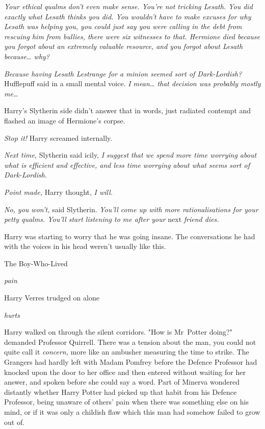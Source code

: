 \emph{Your ethical qualms don't even make sense. You're not tricking Lesath.
You did exactly what Lesath thinks you did. You wouldn't have to make excuses
for why Lesath was helping you, you could just say you were calling in the debt
from rescuing him from bullies, there were six witnesses to that. Hermione died
because you forgot about an extremely valuable resource, and you forgot about
Lesath because{\ldots} why?}

\emph{Because having Lesath Lestrange for a minion seemed sort of
Dark-Lordish?} Hufflepuff said in a small mental voice. \emph{I mean{\ldots}
that decision was probably mostly me{\ldots}}

Harry's Slytherin side didn't answer that in words, just radiated contempt and
flashed an image of Hermione's corpse.

\emph{Stop it!} Harry screamed internally.

\emph{Next time,} Slytherin said icily, \emph{I suggest that we spend more time
worrying about what is efficient and effective, and less time worrying about
what seems sort of Dark-Lordish.}

\emph{Point made,} Harry thought, \emph{I will.}

\emph{No, you won't,} said Slytherin. \emph{You'll come up with more
rationalisations for your petty qualms. You'll start listening to me after
your} next \emph{friend dies.}

Harry was starting to worry that he was going insane. The conversations he had
with the voices in his head weren't usually like this.

The Boy-Who-Lived

\emph{pain}

Harry Verres trudged on alone

\emph{hurts}

Harry walked on through the silent corridors.
\later
"How is Mr~Potter doing?" demanded Professor Quirrell. There was a tension
about the man, you could not quite call it \emph{concern,} more like an
ambusher measuring the time to strike. The Grangers had hardly left with Madam
Pomfrey before the Defence Professor had knocked upon the door to her office
and then entered without waiting for her answer, and spoken before she could
say a word. Part of Minerva wondered distantly whether Harry Potter had picked
up that habit from his Defence Professor, being unaware of others' pain when
there was something else on his mind, or if it was only a childish flaw which
this man had somehow failed to grow out of.


